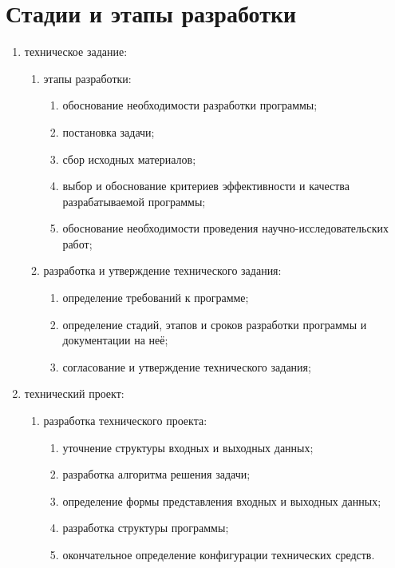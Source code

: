\section{Стадии и этапы разработки}

\begin{enumerate}
    \item техническое задание:
    \begin{enumerate}
        \item этапы разработки:
        \begin{enumerate}
            \item обоснование необходимости разработки программы;
            \item постановка задачи;
            \item сбор исходных материалов;
            \item выбор и обоснование критериев эффективности и качества разрабатываемой программы;
            \item обоснование необходимости проведения научно-исследовательских работ;
        \end{enumerate}
        \item разработка и утверждение технического задания:
        \begin{enumerate}
            \item определение требований к программе;
            \item определение стадий, этапов и сроков разработки программы и документации на неё;
            \item согласование и утверждение технического задания;
        \end{enumerate}
    \end{enumerate}
    \item технический проект:
    \begin{enumerate}
        \item разработка технического проекта:
        \begin{enumerate}
            \item уточнение структуры входных и выходных данных;
            \item разработка алгоритма решения задачи;
            \item определение формы представления входных и выходных данных;
            \item разработка структуры программы;
            \item окончательное определение конфигурации технических средств.

\end{enumerate}
\end{enumerate}
\end{enumerate}
